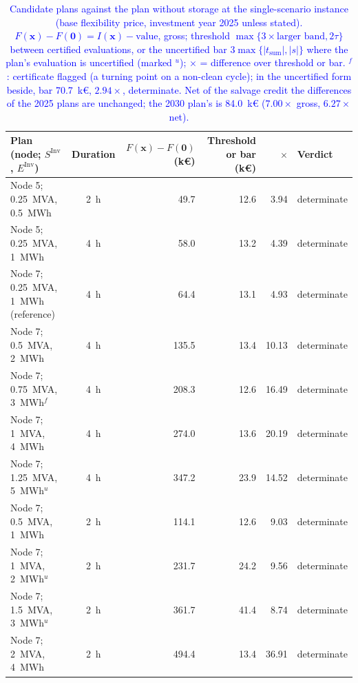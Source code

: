\begin{table}[htbp!]
    \centering
    \caption{\textcolor{blue}{Candidate plans against the plan without storage at the single-scenario instance (base flexibility price, investment year 2025 unless stated). $F(\boldsymbol{x}) - F(\boldsymbol{0}) = I(\boldsymbol{x}) - \text{value}$, gross; threshold $\max\{3 \times \text{larger band}, 2\tau\}$ between certified evaluations, or the uncertified bar $3 \max\{|t_{\text{sum}}|, |s|\}$ where the plan's evaluation is uncertified (marked $^{u}$); $\times$ = difference over threshold or bar. $^{f}$: certificate flagged (a turning point on a non-clean cycle); in the uncertified form beside, bar 70.7~k\euro, $2.94\times$, determinate. Net of the salvage credit the differences of the 2025 plans are unchanged; the 2030 plan's is 84.0~k\euro{} ($7.00\times$ gross, $6.27\times$ net).}}
    \label{tab:res_value_ladder}
    \scriptsize\setlength{\tabcolsep}{4pt}
    \begin{tabular}{l c r r r l}
        \toprule
        Plan (node; $S^{\text{Inv}}$, $E^{\text{Inv}}$) & Duration & $F(\boldsymbol{x}) - F(\boldsymbol{0})$ (k\euro) & Threshold or bar (k\euro) & $\times$ & Verdict \\
        \midrule
        Node 5; 0.25~MVA, 0.5~MWh            & 2~h & 49.7  & 12.6 & 3.94  & determinate \\
        Node 5; 0.25~MVA, 1~MWh              & 4~h & 58.0  & 13.2 & 4.39  & determinate \\
        Node 7; 0.25~MVA, 1~MWh (reference)  & 4~h & 64.4  & 13.1 & 4.93  & determinate \\
        Node 7; 0.5~MVA, 2~MWh               & 4~h & 135.5 & 13.4 & 10.13 & determinate \\
        Node 7; 0.75~MVA, 3~MWh$^{f}$        & 4~h & 208.3 & 12.6 & 16.49 & determinate \\
        Node 7; 1~MVA, 4~MWh                 & 4~h & 274.0 & 13.6 & 20.19 & determinate \\
        Node 7; 1.25~MVA, 5~MWh$^{u}$        & 4~h & 347.2 & 23.9 & 14.52 & determinate \\
        Node 7; 0.5~MVA, 1~MWh               & 2~h & 114.1 & 12.6 & 9.03  & determinate \\
        Node 7; 1~MVA, 2~MWh$^{u}$           & 2~h & 231.7 & 24.2 & 9.56  & determinate \\
        Node 7; 1.5~MVA, 3~MWh$^{u}$         & 2~h & 361.7 & 41.4 & 8.74  & determinate \\
        Node 7; 2~MVA, 4~MWh                 & 2~h & 494.4 & 13.4 & 36.91 & determinate \\

\end{tabular}
\end{table}
